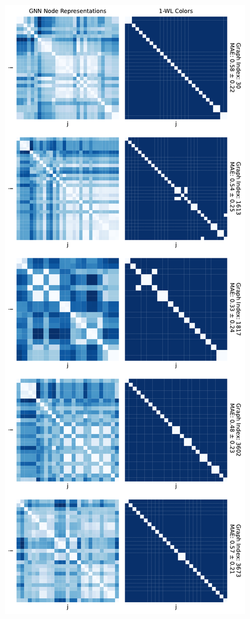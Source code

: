 \begin{figure}[!ht]
    \centering
    \begin{minipage}[b]{0.45992852703\textwidth}
        \centering
        \includegraphics[width=\textwidth, left]{Figures/heatmaps_NCI1_0.pdf}

\end{minipage}
\end{figure}
